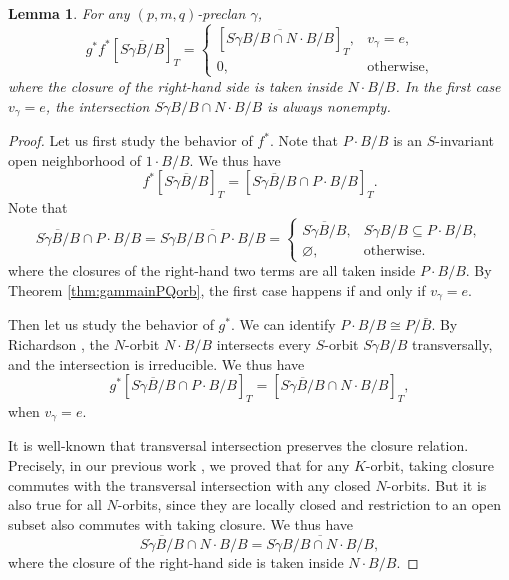 \documentclass[12pt,reqno]{amsart}
\numberwithin{equation}{section}
\newtheorem{lemma}[theorem]{Lemma}
\theoremstyle{definition}
\begin{document}
\begin{lemma}\label{lemma:diag2}
For any $(p,m,q)$-preclan $\gamma$, 
$$g^*f^*[\overline{S\dot{\gamma}B/B}]_T
= 
\begin{cases}
[\overline{S\dot{\gamma}B/B\cap N\cdot B/B}]_T, 
& v_\gamma = e,\\
0, & \text{otherwise},
\end{cases}
$$
where the closure of the right-hand side is taken inside $N\cdot B/B$. 
In the first case $v_\gamma=e$, the intersection $S\dot{\gamma}B/B\cap N\cdot B/B$ is always nonempty. 
\end{lemma}
\begin{proof}
Let us first study the behavior of $f^*$. 
Note that $P\cdot B/B$ is an $S$-invariant open neighborhood of $1\cdot B/B$. We thus have 
$$f^*[\overline{S\dot{\gamma}B/B}]_T
= [\overline{S\dot{\gamma}B/B}\cap P\cdot B/B]_T.$$
Note that 
$$\overline{S\dot{\gamma}B/B}\cap P\cdot B/B
=\overline{S\dot{\gamma}B/B\cap P\cdot B/B}
=\begin{cases}
\overline{S\dot{\gamma}B/B}, & S\dot{\gamma}B/B\subseteq P\cdot B/B,\\
\varnothing, & \text{otherwise}. 
\end{cases}
$$
where the closures of the right-hand two terms are all taken inside $P\cdot B/B$. 
By Theorem \ref{thm:gammainPQorb}, 
the first case happens if and only if $v_\gamma = e$. 

Then let us study the behavior of $g^*$. 
We can identify $P\cdot B/B\cong P/\bar{B}$. 
By Richardson \cite{Richardson92}, the $N$-orbit $N\cdot B/B$ intersects every $S$-orbit $S\dot{\gamma}B/B$ transversally, and the intersection is irreducible. 
We thus have 
$$g^*[\overline{S\dot{\gamma}B/B}\cap P\cdot B/B]_T
=[\overline{S\dot{\gamma}B/B}\cap N\cdot B/B]_T,$$
when $v_\gamma=e$. 

It is well-known that transversal intersection preserves the closure relation. 
Precisely, in our previous work \cite[Lemma 3.2]{WE}, we proved that for any $K$-orbit,  taking closure
commutes with the transversal intersection with any closed $N$-orbits. 
But it is also true for all $N$-orbits, since they are locally closed \cite[Section 8.3]{Humph} and restriction to an open subset also commutes with taking closure. We thus have 
$$\overline{S\dot{\gamma}B/B}\cap N\cdot B/B = \overline{S\dot{\gamma}B/B\cap N\cdot B/B},$$
where the closure of the right-hand side is taken inside $N\cdot B/B$. 


\end{proof}
\end{document}
